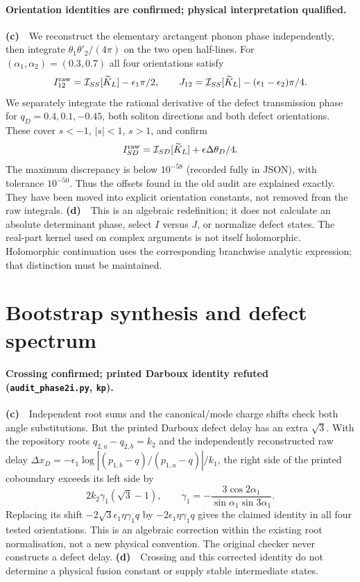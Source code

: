 \documentclass[11pt,a4paper]{article}
\newcommand{\Lc}{\textbf{(c)}\ }
\newcommand{\Ld}{\textbf{(d)}\ }
\newcommand{\scr}{\texttt{audit\_\allowbreak phase2i.py}}
\begin{document}
\paragraph{Orientation identities are confirmed; physical interpretation qualified.}
\Lc\ We reconstruct the elementary arctangent phonon phase independently,
then integrate $\theta_1\theta'_2/(4\pi)$ on the two open half-lines.
For $(\alpha_1,\alpha_2)=(0.3,0.7)$ all four orientations satisfy
\[
 I^{\rm raw}_{12}=\mathcal I_{SS}[\widetilde K_L]-\epsilon_1\pi/2,
 \qquad J_{12}=\mathcal I_{SS}[\widetilde K_L]
                       -(\epsilon_1-\epsilon_2)\pi/4.
\]
We separately integrate the rational derivative of the defect transmission
phase for $q_D=0.4,0.1,-0.45$, both soliton directions and both defect
orientations. These cover $s<-1$, $|s|<1$, $s>1$, and confirm
\[
 I_{SD}^{\rm raw}=\mathcal I_{SD}[\widetilde K_L]
                         +\epsilon\Delta\theta_D/4.
\]
The maximum discrepancy is below $10^{-58}$ (recorded fully in JSON), with tolerance $10^{-50}$.
Thus the offsets found in the old audit are explained exactly. They have
been moved into explicit orientation constants, not removed from the raw
integrals. \Ld\ This is an algebraic redefinition; it does not calculate
an absolute determinant phase, select $I$ versus $J$, or normalize defect
states. The real-part kernel used on complex arguments is not itself
holomorphic. Holomorphic continuation uses the corresponding branchwise
analytic expression; that distinction must be maintained.

\section{Bootstrap synthesis and defect spectrum}
\paragraph{Crossing confirmed; printed Darboux identity refuted (\scr, \texttt{kp}).}
\Lc\ Independent root sums and the canonical/mode charge shifts check both angle
substitutions. But the printed Darboux defect delay has an extra $\sqrt3$.
With the repository roots $q_{2,a}-q_{2,b}=k_2$ and the independently
reconstructed raw delay
$\Delta x_D=-\epsilon_1\log|(p_{1,b}-q)/(p_{1,a}-q)|/k_1$,
the right side of the printed coboundary exceeds its left side by
\begin{equation}
 2k_2\gamma_1(\sqrt3-1),\qquad
 \gamma_1=-\frac{3\cos2\alpha_1}{\sin\alpha_1\sin3\alpha_1}.
\end{equation}
Replacing its shift $-2\sqrt3\epsilon_1\eta\gamma_1q$ by
$-2\epsilon_1\eta\gamma_1q$ gives the claimed identity in all four tested
orientations. This is an algebraic correction within the existing root
normalisation, not a new physical convention. The original checker never
constructs a defect delay. \Ld\ Crossing and this corrected identity do not
determine a physical fusion constant or supply stable intermediate states.
\end{document}
